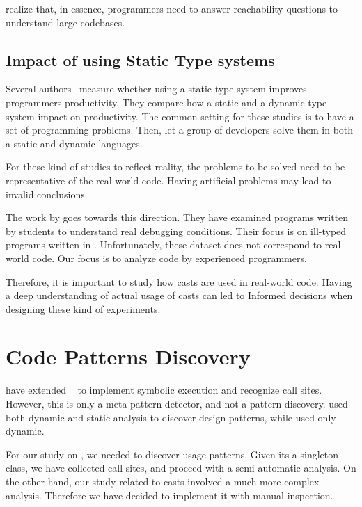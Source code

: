 \label{sec:controlled-experiments}

\cite{latoza_developers_2010} realize that, in essence, programmers need to answer reachability questions to understand large codebases.

\subsection*{Impact of using Static Type systems}

Several authors~\cite{stuchlik_static_2011,mayer_empirical_2012,harlin_impact_2017} measure whether using a static-type system improves programmers productivity.
They compare how a static and a dynamic type system impact on productivity.
The common setting for these studies is to have a set of programming problems.
Then, let a group of developers solve them in both a static and dynamic languages.

For these kind of studies to reflect reality, the problems to be solved need to
be representative of the real-world code.
Having artificial problems may lead to invalid conclusions.

The work by \cite{wu_how_2017,wu_learning_2017} goes towards this direction.
They have examined programs written by students to understand real debugging conditions.
Their focus is on ill-typed programs written in \haskell{}.
Unfortunately, these dataset does not correspond to real-world code.
Our focus is to analyze code by experienced programmers.

Therefore, it is important to study how casts are used in real-world code.
Having a deep understanding of actual usage of casts can led to
Informed decisions when designing these kind of experiments.


\section{Code Patterns Discovery}

\label{sec:pattern-discovery}

\cite{posnett_thex:_2010} have extended \asm{}~\cite{bruneton_asm:_2002,kuleshov_using_2007} to implement symbolic execution and recognize call sites.
However, this is only a meta-pattern detector, and not a pattern discovery.
\cite{hu_dynamic_2008} used both dynamic and static analysis to discover design patterns, while \cite{arcelli_design_2008} used only dynamic.

For our study on \smu{}, we needed to discover usage patterns.
Given its a singleton class, we have collected call sites,
and proceed with a semi-automatic analysis.
On the other hand, our study related to casts involved a much more complex analysis.
Therefore we have decided to implement it with manual inspection.


